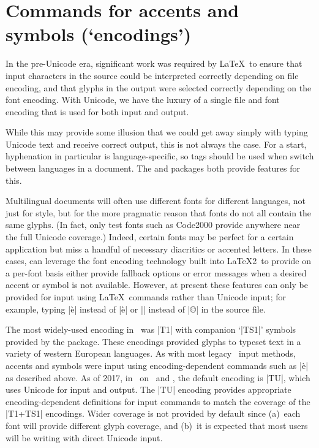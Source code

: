 \documentclass[a4paper]{ltxdoc}
\begin{document}
\part{Commands for accents and symbols (`encodings')}

In the pre-Unicode era, significant work was required by \LaTeX\ to ensure that
input characters in the source could be interpreted correctly depending on file encoding,
and that glyphs in the output were selected correctly depending on the font encoding.
With Unicode, we have the luxury of a single file and font encoding that is used for both input
and output.

While this may provide some illusion that we could get away simply with typing
Unicode text and receive correct output, this is not always the case.
For a start, hyphenation in particular is language-specific, so tags should be used
when switch between languages in a document.
The  and  packages both provide features for this.

Multilingual documents will often use different fonts for different languages,
not just for style, but for the more pragmatic reason that fonts do not all contain
the same glyphs. (In fact, only test fonts such as Code2000 provide
anywhere near the full Unicode coverage.)
Indeed, certain fonts may be perfect for a certain application but miss a handful
of necessary diacritics or accented letters.
In these cases,  can leverage the font encoding technology built
into \LaTeX2\ to provide on a per-font basis either provide fallback options or
error messages when a desired accent or symbol is not available.
However, at present
these features can only be provided for input using \LaTeX\ commands rather
than Unicode input; for example, typing |\`e| instead of |è| or |\textcopyright|
instead of |©| in the source file.

The most widely-used encoding in \LaTeXe\ was |T1| with companion `|TS1|' symbols
provided by the  package.
These encodings provided glyphs to typeset text in a variety of western European languages.
As with most legacy \LaTeXe\ input methods, accents and symbols were input using
encoding-dependent commands such as |\`e| as described above.
As of 2017, in \LaTeXe\ on \XeTeX\ and \LuaTeX, the default encoding is |TU|,
which uses Unicode for input and output.
The |TU| encoding provides appropriate encoding-dependent definitions for input commands
to match the coverage of the |T1+TS1| encodings.
Wider coverage is not provided by default since (a)~each font will provide different glyph coverage, and
(b)~it is expected that most users will be writing with direct Unicode input.
\end{document}

